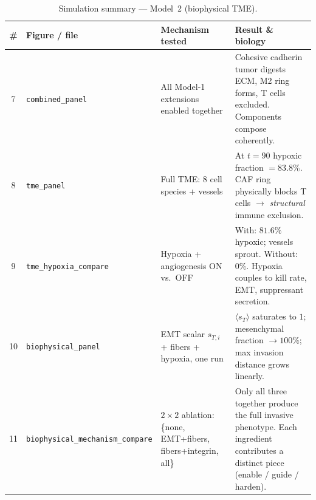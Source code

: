 \begin{table}[h]
\centering\small
\caption{Simulation summary --- Model~2 (biophysical TME).}
\renewcommand{\arraystretch}{1.15}
\begin{tabularx}{\textwidth}{@{}c l X X@{}}
\toprule
\# & \textbf{Figure / file} & \textbf{Mechanism tested} & \textbf{Result \& biology} \\
\midrule
7 & \texttt{combined\_panel} &
All Model-1 extensions enabled together &
Cohesive cadherin tumor digests ECM, M2 ring forms, T cells excluded. Components compose coherently. \\
8 & \texttt{tme\_panel} &
Full TME: 8 cell species + vessels &
At $t\!=\!90$ hypoxic fraction $= 83.8\%$. CAF ring physically blocks T cells $\to$ \emph{structural} immune exclusion. \\
9 & \texttt{tme\_hypoxia\_compare} &
Hypoxia + angiogenesis ON vs.\ OFF &
With: $81.6\%$ hypoxic; vessels sprout. Without: $0\%$. Hypoxia couples to kill rate, EMT, suppressant secretion. \\
10 & \texttt{biophysical\_panel} &
EMT scalar $s_{T,i}$ + fibers + hypoxia, one run &
$\langle s_T\rangle$ saturates to $1$; mesenchymal fraction $\to 100\%$; max invasion distance grows linearly. \\
11 & \texttt{biophysical\_mechanism\_compare} &
$2\times 2$ ablation: \{none, EMT+fibers, fibers+integrin, all\} &
Only all three together produce the full invasive phenotype. Each ingredient contributes a distinct piece (enable / guide / harden). \\
\bottomrule
\end{tabularx}
\label{tab:m2-summary}
\end{table}
